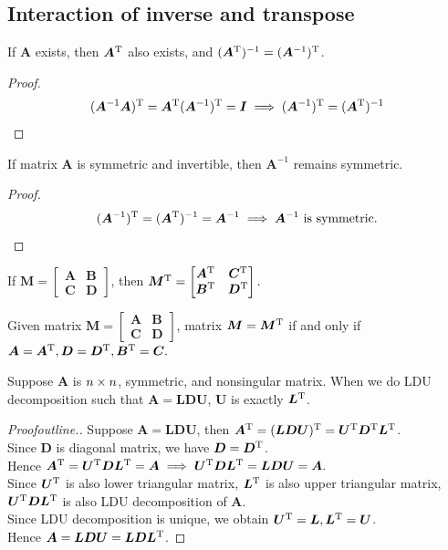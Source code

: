 \subsection{Interaction of inverse and transpose}
\begin{proposition}
If $\bm A$ exists, then $\bm A^{\mathrm T}$ also exists, and $(\bm A^{\mathrm T})^{-1} = (\bm A^{-1})^{\mathrm T}$.
\end{proposition}
\begin{proof}
\[(\bm A^{-1}\bm A)^{\mathrm T} = \bm A^{\mathrm T}(\bm A^{-1})^{\mathrm T} = \bm I \implies (\bm A^{-1})^{\mathrm T} = (\bm A^{\mathrm T})^{-1}\]
\end{proof}
\begin{corollary}
If matrix $\bm A$ is symmetric and invertible, then $\bm A^{-1}$ remains symmetric.
\end{corollary}
\begin{proof}
\[
(\bm A^{-1})^{\mathrm T} = (\bm A^{\mathrm T})^{-1} = \bm A^{-1}
\implies \text{$\bm A^{-1}$ is symmetric.}
\]
\end{proof}
\begin{proposition}
If $\bm M = \begin{bmatrix}
\bm A&\bm B\\\bm C&\bm D
\end{bmatrix}$, then $\bm M^{\mathrm T} = \begin{bmatrix}
\bm A^{\mathrm T}&\bm C^{\mathrm T}\\\bm B^{\mathrm T}&\bm D^{\mathrm T}
\end{bmatrix}.$
\end{proposition}
\begin{corollary}
Given matrix $\bm M = \begin{bmatrix}
\bm A&\bm B\\\bm C&\bm D
\end{bmatrix}$, matrix $\bm M = \bm M^{\mathrm T}$ if and only if $\bm A=\bm A^{\mathrm T},\bm D =\bm D^{\mathrm T},\bm B^{\mathrm T} = \bm C.$
\end{corollary}
\begin{proposition}
Suppose $\bm A$ is $n\times n$, symmetric, and nonsingular matrix. When we do LDU decomposition such that $\bm A = \bm L\bm D\bm U$, $\bm U$ is exactly $\bm L^{\mathrm T}$.
\end{proposition}
\begin{proof}[Proofoutline.]
Suppose $\bm A = \bm{LDU}$, then $\bm A^{\mathrm T} = (\bm{LDU})^{\mathrm T} = \bm U^{\mathrm T}\bm D^{\mathrm T}\bm L^{\mathrm T}$.\\
Since $\bm D$ is diagonal matrix, we have $\bm D = \bm D^{\mathrm T}$.\\
Hence $\bm A^{\mathrm T} = \bm U^{\mathrm T}\bm D\bm L^{\mathrm T} = \bm A \implies \bm U^{\mathrm T}\bm D\bm L^{\mathrm T} = \bm{LDU} = \bm A.$\\
Since $\bm U^{\mathrm T}$ is also lower triangular matrix, $\bm L^{\mathrm T}$ is also upper triangular matrix, $\bm U^{\mathrm T}\bm D\bm L^{\mathrm T}$ is also LDU decomposition of $\bm A$.\\
Since LDU decomposition is unique, we obtain $\bm U^{\mathrm T} = \bm L,\bm L^{\mathrm T} = \bm U$.\\
Hence $\bm A = \bm{LDU} = \bm{LD}\bm L^{\mathrm T}$.
\end{proof}
